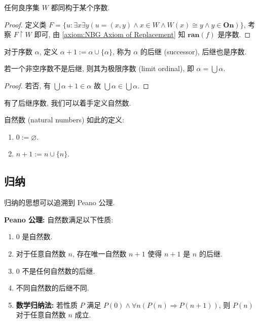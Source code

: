 \begin{lemma}
    任何良序集 \(W\) 都同构于某个序数.

    \begin{proof}
        定义类 \(F = \{u : \exists x \exists y(u=(x,y) \land x \in W \land W(x) \cong y \land y \in \mathbf{On})\}\), 
        考察 \(F \upharpoonright W\) 即可, 由 \ref{axiom:NBG Axiom of Replacement} 知 \(\mathbf{ran} (f)\) 是序数.
    \end{proof}
\end{lemma}

\begin{definition}
    对于序数 \(\alpha\), 定义 \(\alpha + 1 := \alpha \cup \{\alpha\}\), 称为 \(\alpha\) 的后继 (successor), 后继也是序数.
\end{definition}

\begin{corollary}
    \label{corollary:ordinal numbers are successors or limits}
    若一个非空序数不是后继, 则其为极限序数 (limit ordinal), 即 \(\alpha = \bigcup \alpha\).

    \begin{proof}
        若否, 有 \(\bigcup \alpha + 1 \in \alpha\) 故 \(\bigcup \alpha \in \bigcup \alpha\).
    \end{proof}
\end{corollary}

有了后继序数, 我们可以着手定义自然数.

\begin{definition}
    \label{definition:natural numbers}
    自然数 (natural numbers) 如此的定义:
    \begin{enumerate}
        \item \(0 := \varnothing\).
        \item \(n + 1 := n \cup \{n\}\).
    \end{enumerate}
\end{definition}

\subsection{归纳}

归纳的思想可以追溯到 Peano 公理.

\begin{example}
    \textbf{Peano 公理:} 自然数满足以下性质:
    \begin{enumerate}
        \item \(0\) 是自然数.
        \item 对于任意自然数 \(n\), 存在唯一自然数 \(n+1\) 使得 \(n+1\) 是 \(n\) 的后继.
        \item \(0\) 不是任何自然数的后继.
        \item 不同自然数的后继不同.
        \item \textbf{数学归纳法:} 若性质 \(P\) 满足 \(P(0) \land \forall n (P(n) \Rightarrow P(n+1))\), 则 \(P(n)\) 对于任意自然数 \(n\) 成立. 
    \end{enumerate}
\end{example}

